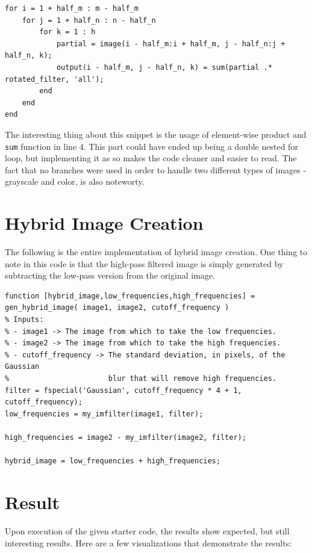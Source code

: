 \begin{lstlisting}[style=Matlab-editor]
for i = 1 + half_m : m - half_m
    for j = 1 + half_n : n - half_n
        for k = 1 : h
            partial = image(i - half_m:i + half_m, j - half_n:j + half_n, k);
            output(i - half_m, j - half_n, k) = sum(partial .* rotated_filter, 'all');
        end
    end
end
\end{lstlisting}

The interesting thing about this snippet is the usage of element-wise product and \texttt{sum} function in line 4. This part could have ended up being a double nested for loop, but implementing it as so makes the code cleaner and easier to read. The fact that no branches were used in order to handle two different types of images - grayscale and color, is also noteworty.

\section*{Hybrid Image Creation}
The following is the entire implementation of hybrid image creation. One thing to note in this code is that the high-pass filtered image is simply generated by subtracting the low-pass version from the original image.
\begin{lstlisting}[style=Matlab-editor]
function [hybrid_image,low_frequencies,high_frequencies] = gen_hybrid_image( image1, image2, cutoff_frequency )
% Inputs:
% - image1 -> The image from which to take the low frequencies.
% - image2 -> The image from which to take the high frequencies.
% - cutoff_frequency -> The standard deviation, in pixels, of the Gaussian
%                       blur that will remove high frequencies.
filter = fspecial('Gaussian', cutoff_frequency * 4 + 1, cutoff_frequency);
low_frequencies = my_imfilter(image1, filter);

high_frequencies = image2 - my_imfilter(image2, filter);

hybrid_image = low_frequencies + high_frequencies;
\end{lstlisting}

\section*{Result}
Upon execution of the given starter code, the results show expected, but still interesting results. Here are a few visualizations that demonstrate the results:

